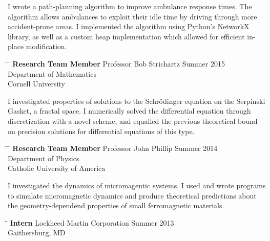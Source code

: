 \documentclass[12pt]{res}
\begin{document}
\begin{resume}
	\noindent
	I wrote a path-planning algorithm to improve ambulance response times.
	The algorithm allows ambulances to exploit their idle time by
driving through more accident-prone areas.
	I implemented the algorithm using Python's NetworkX library,
as well as a custom heap implementation which allowed for
efficient in-place modification.
    
    \vspace{5pt}
    \begin{tabbing}
      \hspace{2.3in} \= \hspace{2.6in} \= \kill
      {\bf Research Team Member} \> Professor Bob Strichartz  \> Summer 2015 \\
		\> Department of Mathematics\\
		\> Cornell University \\
    \end{tabbing}\vspace{-30pt}	

	\noindent
	I investigated properties of solutions to the Schrödinger equation on
		the Serpinski Gasket, a fractal space.
	I numerically solved the differential equation through discretization
		with a novel scheme, and equalled the previous theoretical bound
		on precision solutions for differential equations of this type.

	\vspace{5pt}
	\begin{tabbing}
		\hspace{2.3in} \= \hspace{2.6in} \= \kill
		{\bf Research Team Member} \> Professor John Phillip \> Summer 2014 \\
		\> Department of Physics\\
		\> Catholic University of America \\
	\end{tabbing} \vspace{-30pt}

	\noindent
	I investigated the dynamics of micromagentic systems.
	I used and wrote programs to simulate micromagnetic dynamics and produce
		theoretical predictions about the geometry-dependend properties
		of small ferromagnetic materials. 

    \begin{tabbing}
    \hspace{2.3in}\= \hspace{2.6in}\= \kill %
    \textbf{ Intern } \> Lockheed Martin Corporation \> Summer 2013\\
                  \> Gaithersburg, MD
    \end{tabbing}\vspace{-10pt}


\end{resume}
\end{document}
